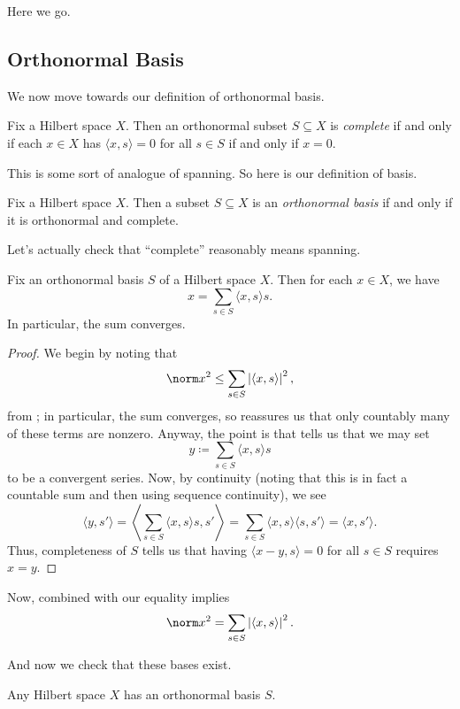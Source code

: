 \documentclass[../notes.tex]{subfiles}
\begin{document}
Here we go.

\subsection{Orthonormal Basis}
We now move towards our definition of orthonormal basis.
\begin{definition}[complete]
	Fix a Hilbert space $X$. Then an orthonormal subset $S\subseteq X$ is \textit{complete} if and only if each $x\in X$ has $\langle x,s\rangle=0$ for all $s\in S$ if and only if $x=0$.
\end{definition}
This is some sort of analogue of spanning. So here is our definition of basis.
\begin{definition}
	Fix a Hilbert space $X$. Then a subset $S\subseteq X$ is an \textit{orthonormal basis} if and only if it is orthonormal and complete.
\end{definition}
Let's actually check that ``complete'' reasonably means spanning.
\begin{lemma} \label{lem:use-hilbert-basis}
	Fix an orthonormal basis $S$ of a Hilbert space $X$. Then for each $x\in X$, we have
	\[x=\sum_{s\in S}\langle x,s\rangle s.\]
	In particular, the sum converges.
\end{lemma}
\begin{proof}
	We begin by noting that
	\[\norm x^2\le\sum_{s\in S}\left|\langle x,s\rangle\right|^2,\]
	from ; in particular, the sum converges, so  reassures us that only countably many of these terms are nonzero. Anyway, the point is that  tells us that we may set
	\[y\coloneqq\sum_{s\in S}\langle x,s\rangle s\]
	to be a convergent series. Now, by continuity (noting that this is in fact a countable sum and then using sequence continuity), we see
	\[\langle y,s'\rangle=\left\langle\sum_{s\in S}\langle x,s\rangle s,s'\right\rangle=\sum_{s\in S}\langle x,s\rangle\langle s,s'\rangle=\langle x,s'\rangle.\]
	Thus, completeness of $S$ tells us that having $\langle x-y,s\rangle=0$ for all $s\in S$ requires $x=y$.
\end{proof}
\begin{remark}
	Now,  combined with our equality implies
	\[\norm x^2=\sum_{s\in S}\left|\langle x,s\rangle\right|^2.\]
\end{remark}
And now we check that these bases exist.
\begin{theorem} \label{thm:hilb-has-ortho-basis}
	Any Hilbert space $X$ has an orthonormal basis $S$.
\end{theorem}
\end{document}
